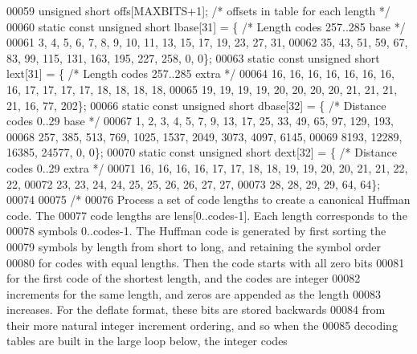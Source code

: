 \begin{DoxyCode}
00059     \textcolor{keywordtype}{unsigned} \textcolor{keywordtype}{short} offs[MAXBITS+1];     \textcolor{comment}{/* offsets in table for each length */}
00060     \textcolor{keyword}{static} \textcolor{keyword}{const} \textcolor{keywordtype}{unsigned} \textcolor{keywordtype}{short} lbase[31] = \{ \textcolor{comment}{/* Length codes 257..285 base */}
00061         3, 4, 5, 6, 7, 8, 9, 10, 11, 13, 15, 17, 19, 23, 27, 31,
00062         35, 43, 51, 59, 67, 83, 99, 115, 131, 163, 195, 227, 258, 0, 0\};
00063     \textcolor{keyword}{static} \textcolor{keyword}{const} \textcolor{keywordtype}{unsigned} \textcolor{keywordtype}{short} lext[31] = \{ \textcolor{comment}{/* Length codes 257..285 extra */}
00064         16, 16, 16, 16, 16, 16, 16, 16, 17, 17, 17, 17, 18, 18, 18, 18,
00065         19, 19, 19, 19, 20, 20, 20, 20, 21, 21, 21, 21, 16, 77, 202\};
00066     \textcolor{keyword}{static} \textcolor{keyword}{const} \textcolor{keywordtype}{unsigned} \textcolor{keywordtype}{short} dbase[32] = \{ \textcolor{comment}{/* Distance codes 0..29 base */}
00067         1, 2, 3, 4, 5, 7, 9, 13, 17, 25, 33, 49, 65, 97, 129, 193,
00068         257, 385, 513, 769, 1025, 1537, 2049, 3073, 4097, 6145,
00069         8193, 12289, 16385, 24577, 0, 0\};
00070     \textcolor{keyword}{static} \textcolor{keyword}{const} \textcolor{keywordtype}{unsigned} \textcolor{keywordtype}{short} dext[32] = \{ \textcolor{comment}{/* Distance codes 0..29 extra */}
00071         16, 16, 16, 16, 17, 17, 18, 18, 19, 19, 20, 20, 21, 21, 22, 22,
00072         23, 23, 24, 24, 25, 25, 26, 26, 27, 27,
00073         28, 28, 29, 29, 64, 64\};
00074 
00075     \textcolor{comment}{/*}
00076 \textcolor{comment}{       Process a set of code lengths to create a canonical Huffman code.  The}
00077 \textcolor{comment}{       code lengths are lens[0..codes-1].  Each length corresponds to the}
00078 \textcolor{comment}{       symbols 0..codes-1.  The Huffman code is generated by first sorting the}
00079 \textcolor{comment}{       symbols by length from short to long, and retaining the symbol order}
00080 \textcolor{comment}{       for codes with equal lengths.  Then the code starts with all zero bits}
00081 \textcolor{comment}{       for the first code of the shortest length, and the codes are integer}
00082 \textcolor{comment}{       increments for the same length, and zeros are appended as the length}
00083 \textcolor{comment}{       increases.  For the deflate format, these bits are stored backwards}
00084 \textcolor{comment}{       from their more natural integer increment ordering, and so when the}
00085 \textcolor{comment}{       decoding tables are built in the large loop below, the integer codes}

\end{DoxyCode}
